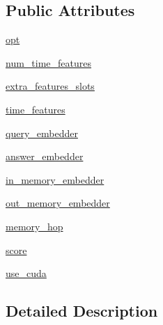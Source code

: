 \subsection*{Public Attributes}
\begin{DoxyCompactItemize}
\item 
\hyperlink{classparlai_1_1agents_1_1legacy__agents_1_1memnn_1_1modules__v0_1_1MemNN_ab39560751f2c13da93f438dfbe90a66a}{opt}
\item 
\hyperlink{classparlai_1_1agents_1_1legacy__agents_1_1memnn_1_1modules__v0_1_1MemNN_a9c8ebec671c266d2a04d2a6e237bdbd0}{num\+\_\+time\+\_\+features}
\item 
\hyperlink{classparlai_1_1agents_1_1legacy__agents_1_1memnn_1_1modules__v0_1_1MemNN_a243f67730dd9c23803a4ba3f7f564ddf}{extra\+\_\+features\+\_\+slots}
\item 
\hyperlink{classparlai_1_1agents_1_1legacy__agents_1_1memnn_1_1modules__v0_1_1MemNN_aa0f005c1f6bfa1a3bf50b552fdcca833}{time\+\_\+features}
\item 
\hyperlink{classparlai_1_1agents_1_1legacy__agents_1_1memnn_1_1modules__v0_1_1MemNN_a8cde58818c77ca537abd7e6f9be5c3b2}{query\+\_\+embedder}
\item 
\hyperlink{classparlai_1_1agents_1_1legacy__agents_1_1memnn_1_1modules__v0_1_1MemNN_a9d41205a1560d3d405b75dc20b58cbef}{answer\+\_\+embedder}
\item 
\hyperlink{classparlai_1_1agents_1_1legacy__agents_1_1memnn_1_1modules__v0_1_1MemNN_a12f680e66ae1f4bf25a20f6270859b0b}{in\+\_\+memory\+\_\+embedder}
\item 
\hyperlink{classparlai_1_1agents_1_1legacy__agents_1_1memnn_1_1modules__v0_1_1MemNN_a9fed7872092d6d4eb4e7ff8da716ce97}{out\+\_\+memory\+\_\+embedder}
\item 
\hyperlink{classparlai_1_1agents_1_1legacy__agents_1_1memnn_1_1modules__v0_1_1MemNN_acac058f9213df5ea5d607472cfd5973f}{memory\+\_\+hop}
\item 
\hyperlink{classparlai_1_1agents_1_1legacy__agents_1_1memnn_1_1modules__v0_1_1MemNN_a6210700dfc0cc07900406c9b48a8267c}{score}
\item 
\hyperlink{classparlai_1_1agents_1_1legacy__agents_1_1memnn_1_1modules__v0_1_1MemNN_a65fdd2bb8f070a9eb8b59698b814640c}{use\+\_\+cuda}
\end{DoxyCompactItemize}


\subsection{Detailed Description}


